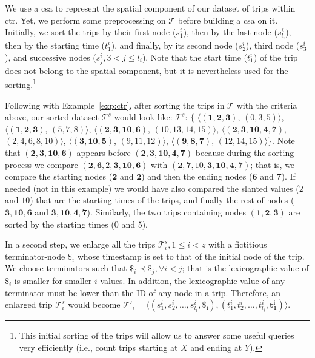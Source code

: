 	We use a \gls{csa} to represent the spatial component of our dataset of trips within \gls{ctr}. Yet,
	we perform some preprocessing on $\mathcal{T}$ before building a \gls{csa} on it. Initially, we 
	sort the trips by their first node ($s^i_1$), then by the last node ($s^i_{l_i}$), then by the starting time
	($t^i_1$), and finally, by its second node ($s^i_2$), third node ($s^i_3$), and successive nodes ($s^i_j, 3<j\leq l_i$). 
	Note that the start time ($t^i_1$) of the trip does not belong to the spatial component, 
	but it is nevertheless used for the sorting.\footnote{This initial sorting of the trips will allow us 
	to answer some useful queries very efficiently  (i.e., count trips starting at $X$ and ending at $Y$).} 

	Following with Example~\ref{exp:ctr}, after sorting the trips in $\mathcal{T}$ with the criteria above, 
	our sorted dataset $\mathcal{T}^s$ would look like: 
	$\mathcal{T}^s$: $\{$%
	$\langle (\mathbf{1,2,3     })$, $(\mathit{0,3,5})                     \rangle$, 
	$\langle (\mathbf{1,2,3     })$, $(\mathit{5,7,8})                     \rangle$, 
	$\langle (\mathbf{2,3,10,6  })$, $(\mathit{10,13,14,15})           \rangle$, 
	$\langle (\mathbf{2,3,10,4,7})$, $(\mathit{2,4,6,8,10}) \rangle$, 
	$\langle (\mathbf{3,10,5    })$, $(\mathit{9,11,12})                     \rangle$, 
	$\langle (\mathbf{9,8,7     })$, $(\mathit{12,14,15})                    \rangle$$\}$. 
	Note that  $ (\mathbf{2,3,10,6  })$ appears before $(\mathbf{2,3,10,4,7})$ because
	during the sorting process we compare $ (\mathbf{2,6,\mathit{2},3, 10,6  })$ with $ (\mathbf{2,7,\mathit{10},3, 10,4,7})$;
	that is, we compare the starting nodes ($\mathbf{2}$ and $\mathbf{2}$) and then the ending nodes ($\mathbf{6}$ and $\mathbf{7}$).
	If needed  (not in this example) we would have also compared the slanted values ($\mathit{2}$ and $\mathit{10}$) 
	that are the starting times of the trips, and finally the rest of nodes  ($ \mathbf{3, 10,6  }$ and $ \mathbf{3, 10,4,7}$).
	Similarly, the two trips containing nodes $ (\mathbf{1,2,3})$ are sorted by the starting times ($\mathit{0}$ and $\mathit{5}$).


	In a second step, we enlarge all the trips $\mathcal{T}^s_i, 1\!\leq\!i\!<\!z$ with a fictitious terminator-node $\$_i$ whose
	timestamp is set to that of the initial node of the trip. We choose terminators such that $\$_i \prec \$_j, \forall i<j$; 
	that is the lexicographic value of $\$_i$ is smaller for smaller $i$ values. In addition, the lexicographic value
	of any terminator must be lower than the ID of any node in a trip. Therefore, an enlarged trip $\mathcal{T}^s_i$
	would become $\mathcal{T}'_i =  \langle (s^i_1, s^i_2, \dots,  s^i_{l_i}, 
	\mathbf{\$_i}),(t^i_1, t^i_2, \dots,  t^i_{l_i}, \mathbf{t^i_1}) \rangle$. 

